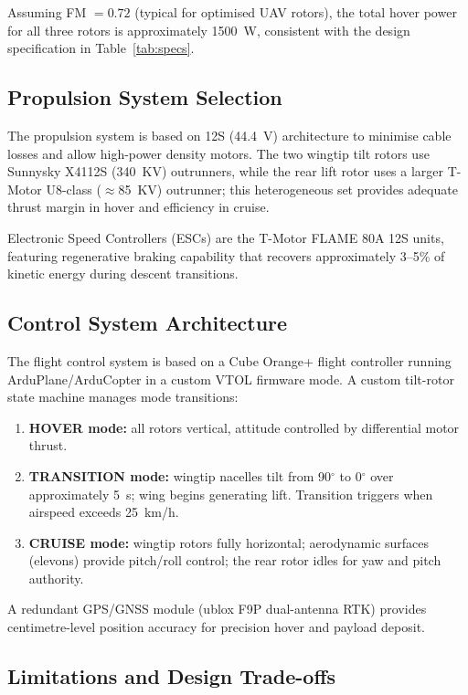 \documentclass[conference]{IEEEtran}
\newcommand{\degrees}{$^{\circ}$}
\begin{document}
Assuming FM $= 0.72$ (typical for optimised UAV rotors),
the total hover power for all three rotors is approximately \SI{1500}{W},
consistent with the design specification in Table~\ref{tab:specs}.

\subsection{Propulsion System Selection}

The propulsion system is based on 12S (\SI{44.4}{V}) architecture to minimise
cable losses and allow high-power density motors.
The two wingtip tilt rotors use Sunnysky X4112S (\SI{340}{KV}) outrunners, while the rear lift rotor uses a larger T-Motor U8-class (\(\approx\)\SI{85}{KV}) outrunner; this heterogeneous set provides adequate thrust margin in hover and efficiency in cruise.

Electronic Speed Controllers (ESCs) are the T-Motor FLAME 80A 12S units,
featuring regenerative braking capability that recovers approximately 3--5\% of
kinetic energy during descent transitions.

\subsection{Control System Architecture}

The flight control system is based on a Cube Orange+ flight controller
running ArduPlane/ArduCopter in a custom VTOL firmware mode.
A custom tilt-rotor state machine manages mode transitions:
\begin{enumerate}
    \item \textbf{HOVER mode:} all rotors vertical, attitude controlled by differential
          motor thrust.
    \item \textbf{TRANSITION mode:} wingtip nacelles tilt from 90\degrees{} to 0\degrees{}
          over approximately \SI{5}{s}; wing begins generating lift.
          Transition triggers when airspeed exceeds \SI{25}{km/h}.
    \item \textbf{CRUISE mode:} wingtip rotors fully horizontal;
          aerodynamic surfaces (elevons) provide pitch/roll control;
          the rear rotor idles for yaw and pitch authority.
\end{enumerate}

A redundant GPS/GNSS module (ublox F9P dual-antenna RTK) provides
centimetre-level position accuracy for precision hover and payload deposit.

\subsection{Limitations and Design Trade-offs}
\end{document}
